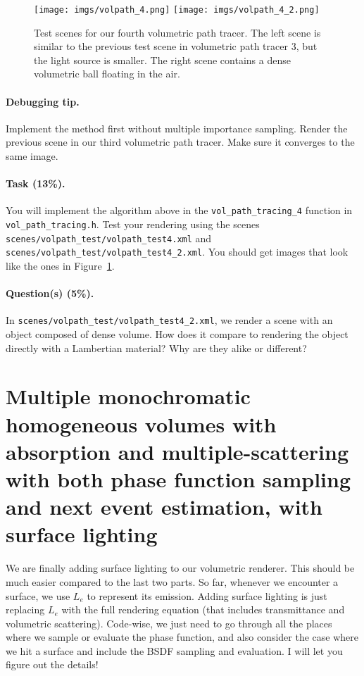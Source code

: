 \begin{figure}
\centering
\texttt{[image: imgs/volpath\_4.png]}
\texttt{[image: imgs/volpath\_4\_2.png]}
\caption{Test scenes for our fourth volumetric path tracer. The left scene is similar to the previous test scene in volumetric path tracer 3, but the light source is smaller. The right scene contains a dense volumetric ball floating in the air.}
\label{fig:volpath4}
\end{figure}

\paragraph{Debugging tip.} Implement the method first without multiple importance sampling. Render the previous scene in our third volumetric path tracer. Make sure it converges to the same image.

\paragraph{Task (13\%).} You will implement the algorithm above in the \lstinline{vol_path_tracing_4} function in \lstinline{vol_path_tracing.h}. Test your rendering using the scenes \lstinline{scenes/volpath_test/volpath_test4.xml} and \lstinline{scenes/volpath_test/volpath_test4_2.xml}. You should get images that look like the ones in Figure~\ref{fig:volpath4}.

\paragraph{Question(s) (5\%).} In \lstinline{scenes/volpath_test/volpath_test4_2.xml}, we render a scene with an object composed of dense volume. How does it compare to rendering the object directly with a Lambertian material? Why are they alike or different?

\section{Multiple monochromatic homogeneous volumes with absorption and multiple-scattering with both phase function sampling and next event estimation, with surface lighting}

We are finally adding surface lighting to our volumetric renderer. This should be much easier compared to the last two parts. So far, whenever we encounter a surface, we use $L_e$ to represent its emission. Adding surface lighting is just replacing $L_e$ with the full rendering equation (that includes transmittance and volumetric scattering). Code-wise, we just need to go through all the places where we sample or evaluate the phase function, and also consider the case where we hit a surface and include the BSDF sampling and evaluation. I will let you figure out the details! 

